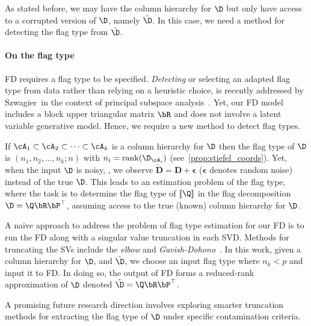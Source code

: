 As stated before, we may have the column hierarchy for $\D$ but only have access to a corrupted version of $\D$, namely $\tilde{\D}$. In this case, we need a method for detecting the flag type from $\tilde{\D}$. 

\paragraph{On the flag type}
FD requires a flag type to be specified. \emph{Detecting} or selecting an adapted flag type from data rather than relying on a heuristic choice, is recently addressed by Szwagier~\etal in the context of principal subspace analysis~\cite{szwagier2024curseisotropyprincipalcomponents}. Yet, our FD model includes a block upper triangular matrix $\bR$ and does not involve a latent variable generative model. Hence, we require a new method to detect flag types.  

    If $\cA_1 \subset \cA_2 \subset \cdots \subset \cA_k$ is a column hierarchy for $\D$ then the flag type of $\D$ is $(n_1,n_2,\dots,n_k;n)$ with $n_i = \mathrm{rank}(\D_{\cA_i})$ (see~\cref{prop:stiefel_coords}). 
    Yet, when the input $\D$ is noisy, \ie, we observe $\tilde{\mathbf{D}} = \mathbf{D} + \bm{\epsilon}$ ($ \bm{\epsilon} $ denotes random noise) instead of the true $\D$. This leads to an estimation problem of the flag type, where the task is to determine the flag type of $[\![\Q]\!]$ in the flag decomposition $\D = \Q\bR \bP^\top$, assuming access to the true (known) column hierarchy for $\D$.     

    A naive approach to address the problem of flag type estimation for our FD is to run the FD along with a singular value truncation in each SVD. Methods for truncating the SVs include the \emph{elbow} and \emph{Gavish-Dohono}~\cite{gavish2014optimal,falini2022review}. In this work, given a column hierarchy for $\D$, and $\tilde{\D}$, we choose an input flag type where $n_k < p$ and input it to FD. In doing so, the output of FD forms a reduced-rank approximation of $\D$ denoted $\hat{\D} = \Q \bR \bP^\top$. 
    
    A promising future research direction involves exploring smarter truncation methods for extracting the flag type of $\D$ under specific contamination criteria. 

    









